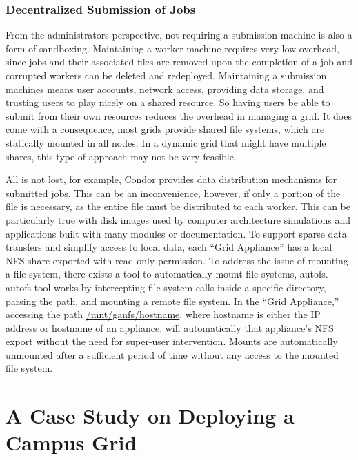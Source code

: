 \documentclass[conference]{IEEEtran}
\begin{document}
\subsubsection{Decentralized Submission of Jobs}

From the administrators perspective, not requiring a submission machine is also
a form of sandboxing.  Maintaining a worker machine requires very low overhead,
since jobs and their associated files are removed upon the completion of a job
and corrupted workers can be deleted and redeployed.  Maintaining a submission
machines means user accounts, network access, providing data storage, and
trusting users to play nicely on a shared resource.  So having users be able to
submit from their own resources reduces the overhead in managing a grid.  It
does come with a consequence, most grids provide shared file systems, which are
statically mounted in all nodes.  In a dynamic grid that might have multiple
shares, this type of approach may not be very feasible.

All is not lost, for example, Condor provides data distribution mechanisms for
submitted jobs.  This can be an inconvenience, however, if only a portion of
the file is necessary, as the entire file must be distributed to each worker.
This can be particularly true with disk images used by computer architecture
simulations and applications built with many modules or documentation.  To
support sparse data transfers and simplify access to local data, each ``Grid
Appliance'' has a local NFS share exported with read-only permission.  To
address the issue of mounting a file system, there exists a tool to
automatically mount file systems, autofs. autofs tool works by intercepting
file system calls inside a specific directory, parsing the path, and mounting a
remote file system.  In the ``Grid Appliance,'' accessing the path
\url{/mnt/ganfs/hostname}, where hostname is either the IP address or hostname
of an appliance, will automatically that appliance's NFS export without the
need for super-user intervention.  Mounts are automatically unmounted after a
sufficient period of time without any access to the mounted file system.  

\section{A Case Study on Deploying a Campus Grid}
\label{case_study}
\end{document}
